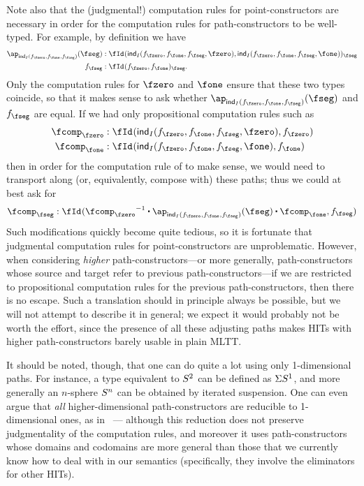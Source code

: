 \documentclass{amsart}
\begin{document}
Note also that the (judgmental!) computation rules for point-constructors are necessary in order for the computation rules for path-constructors to be well-typed.
For example, by definition we have
\begin{align}
  \ap_{\ind{I}(f_\fzero,f_\fone,f_\fseg)}(\fseg) &:
  \idover{\ind{I}(f_\fzero,f_\fone,f_\fseg,\fzero)}{\ind{I}(f_\fzero,f_\fone,f_\fseg,\fone)}{\fseg}\\
  f_\fseg &: \idover{f_\fzero}{f_\fone}{\fseg}.
\end{align}
Only the computation rules for $\fzero$ and $\fone$ ensure that these two types coincide, so that it makes sense to ask whether $\ap_{\ind{I}(f_\fzero,f_\fone,f_\fseg)}(\fseg)$ and $f_\fseg$ are equal.
If we had only propositional computation rules such as
\begin{align}
  \fcomp_\fzero &: \id{\ind{I}(f_\fzero,f_\fone,f_\fseg,\fzero)}{f_\fzero}\\
  \fcomp_\fone &: \id{\ind{I}(f_\fzero,f_\fone,f_\fseg,\fone)}{f_\fone}
\end{align}
then in order for the computation rule of \fseg to make sense, we would need to transport along (or, equivalently, compose with) these paths; thus we could at best ask for
\[ \fcomp_\fseg :
\id{\opp{\fcomp_\fzero}\ct \ap_{\ind{I}(f_\fzero,f_\fone,f_\fseg)}(\fseg) \ct \fcomp_\fone}{f_\fseg}
\]
Such modifications quickly become quite tedious, so it is fortunate that judgmental computation rules for point-constructors are unproblematic.
However, when considering \emph{higher} path-constructors---or more generally, path-constructors whose source and target refer to previous path-constructors---if we are restricted to propositional computation rules for the previous path-constructors, then there is no escape.
Such a translation should in principle always be possible, but we will not attempt to describe it in general; we expect it would probably not be worth the effort, since the presence of all these adjusting paths makes HITs with higher path-constructors barely usable in plain MLTT.

It should be noted, though, that one can do quite a lot using only 1-dimensional paths.
For instance, a type equivalent to $S^{2}$ can be defined as $\Sigma S^1$, and more generally an $n$-sphere $S^{n}$ can be obtained by iterated suspension.
One can even argue that \emph{all} higher-dimensional path-constructors are reducible to 1-dimensional ones, as in~\cite{lumsdaine:hub-and-spoke} --- although this reduction does not preserve judgmentality of the computation rules, and moreover it uses path-constructors whose domains and codomains are more general than those that we currently know how to deal with in our semantics (specifically, they involve the eliminators for other HITs).
\end{document}
